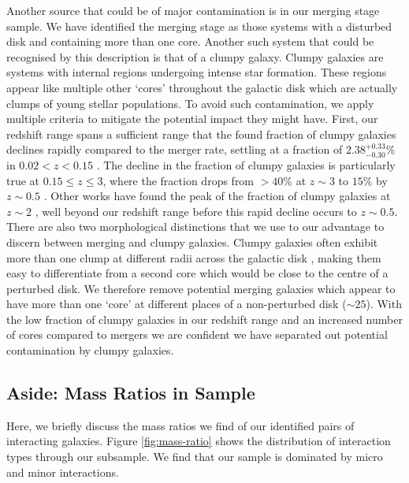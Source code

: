 Another source that could be of major contamination is in our merging stage sample. We have identified the merging stage as those systems with a disturbed disk and containing more than one core. Another such system that could be recognised by this description is that of a clumpy galaxy. Clumpy galaxies are systems with internal regions undergoing intense star formation. These regions appear like multiple other `cores' throughout the galactic disk which are actually clumps of young stellar populations. To avoid such contamination, we apply multiple criteria to mitigate the potential impact they might have. First, our redshift range spans a sufficient range that the found fraction of clumpy galaxies declines rapidly compared to the merger rate, settling at a fraction of $2.38^{+0.33}_{-0.30}\%$ in $0.02 < z < 0.15$ \citep{2022ApJ...931...16A}. The decline in the fraction of clumpy galaxies is particularly true at $0.15 \leq z \leq 3$, where the fraction drops from $>40\%$ at $z \sim 3$ to $15\%$ by $z \sim 0.5$ \citep{2015ApJ...800...39G}. Other works have found the peak of the fraction of clumpy galaxies at $z\sim2$ \citep{2014ApJ...786...15M, 2018ApJ...853..108G}, well beyond our redshift range before this rapid decline occurs to $z \sim 0.5$. There are also two morphological distinctions that we use to our advantage to discern between merging and clumpy galaxies. Clumpy galaxies often exhibit more than one clump at different radii across the galactic disk \citep[with][finding a mean of 3.16 clumps per galaxy]{2022ApJ...931...16A}, making them easy to differentiate from a second core which would be close to the centre of a perturbed disk. We therefore remove potential merging galaxies which appear to have more than one `core' at different places of a non-perturbed disk ($\sim25$). With the low fraction of clumpy galaxies in our redshift range and an increased number of cores compared to mergers we are confident we have separated out potential contamination by clumpy galaxies.

\subsection{Aside: Mass Ratios in Sample}
Here, we briefly discuss the mass ratios we find of our identified pairs of interacting galaxies. Figure \ref{fig:mass-ratio} shows the distribution of interaction types through our subsample. We find that our sample is dominated by micro and minor interactions.

